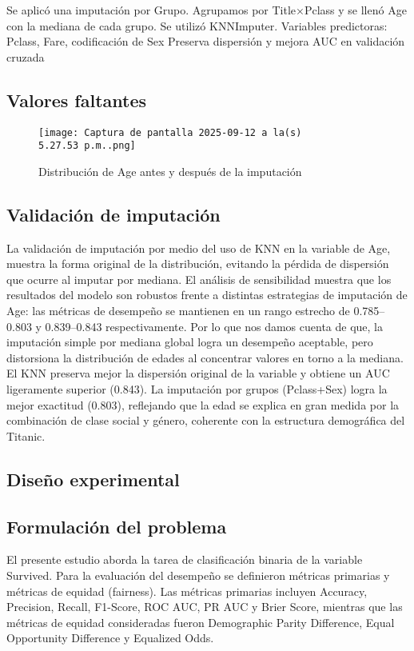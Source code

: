 \documentclass[sjournal]{IEEEtran}
\begin{document}
\vspace{0.5cm}
Se aplicó una imputación por Grupo. 
Agrupamos por Title×Pclass y se llenó Age con la mediana de cada grupo. Se utilizó KNNImputer.
Variables predictoras: Pclass, Fare, codificación de Sex
Preserva dispersión y mejora AUC en validación cruzada

\subsection{Valores faltantes}


\begin{figure}[H]
    \centering
    \texttt{[image: Captura de pantalla 2025-09-12 a la(s) 5.27.53 p.m..png]}
    \caption{Distribución de Age antes y después de la imputación}
    \label{fig:placeholder}
\end{figure}
\subsection*{Validación de imputación}
La validación de imputación por medio del uso de KNN en la variable de Age, muestra la
forma original de la distribución, evitando la pérdida de dispersión que ocurre al imputar por
mediana.
El análisis de sensibilidad muestra que los resultados del modelo son robustos frente a
distintas estrategias de imputación de Age: las métricas de desempeño se mantienen en un
rango estrecho de 0.785–0.803 y 0.839–0.843 respectivamente. Por lo que nos damos cuenta
de que, la imputación simple por mediana global logra un desempeño aceptable, pero
distorsiona la distribución de edades al concentrar valores en torno a la mediana.
El KNN preserva mejor la dispersión original de la variable y obtiene un AUC ligeramente
superior (0.843).
La imputación por grupos (Pclass+Sex) logra la mejor exactitud (0.803), reflejando que la
edad se explica en gran medida por la combinación de clase social y género, coherente con la
estructura demográfica del Titanic.

\subsection{Diseño experimental}

\subsection*{Formulación del  problema}

El presente estudio aborda la tarea de clasificación binaria de la variable Survived. Para la evaluación del desempeño se definieron métricas primarias y métricas de equidad (fairness). Las métricas primarias incluyen Accuracy, Precision, Recall, F1-Score, ROC AUC, PR AUC y Brier Score, mientras que las métricas de equidad consideradas fueron Demographic Parity Difference, Equal Opportunity Difference y Equalized Odds.
\end{document}
